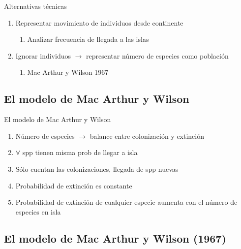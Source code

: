 \documentclass[
  11pt,
  ignorenonframetext,
]{beamer}
\providecommand{\tightlist}{%
  \setlength{\itemsep}{0pt}\setlength{\parskip}{0pt}}
\begin{document}
\begin{frame}{Alternativas técnicas}
\begin{enumerate}
\item
  Representar movimiento de individuos desde continente

  \begin{enumerate}
  \tightlist
  \item
    Analizar frecuencia de llegada a las islas
  \end{enumerate}
\item
  Ignorar individuos \(\rightarrow\) representar número de especies como
  población

  \begin{enumerate}
  \tightlist
  \item
    Mac Arthur y Wilson 1967
  \end{enumerate}
\end{enumerate}
\end{frame}

\hypertarget{el-modelo-de-mac-arthur-y-wilson}{%
\subsection{El modelo de Mac Arthur y
Wilson}\label{el-modelo-de-mac-arthur-y-wilson}}

\begin{frame}{El modelo de Mac Arthur y Wilson}
\begin{enumerate}
\item
  Número de especies \(\rightarrow\) balance entre colonización y
  extinción
\item
  \(\forall\) spp tienen misma prob de llegar a isla
\item
  Sólo cuentan las colonizaciones, llegada de spp nuevas
\item
  Probabilidad de extinción es constante
\item
  Probabilidad de extinción de cualquier especie aumenta con el número
  de especies en isla
\end{enumerate}
\end{frame}

\hypertarget{el-modelo-de-mac-arthur-y-wilson-1967}{%
\subsection{El modelo de Mac Arthur y Wilson
(1967)}\label{el-modelo-de-mac-arthur-y-wilson-1967}}
\end{document}
